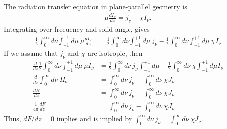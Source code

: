 \newslide

\begin{problem}
The radiation transfer equation in plane-parallel geometry is
\begin{align}
\mu \frac{d I_\nu}{dz} = j_\nu - \chi I_\nu.
\end{align}
Integrating over frequency and solid angle, gives
\begin{align}
\frac{1}{2}\int_0^\infty\!\!\!d\nu\int_{-1}^{+1}\!\!\!d\mu\:\mu\frac{d I_\nu}{dz} 
&=
\frac{1}{2}\int_0^\infty\!\!\!d\nu\int_{-1}^{+1}\!\!\!d\mu\:j_\nu -
\frac{1}{2}\int_0^\infty\!\!\!d\nu\int_{-1}^{+1}\!\!\!d\mu\:\chi I_\nu
\end{align}
If we assume that $j_\nu$ and $\chi$ are isotropic, then
\begin{align}
\frac{d}{dz} \frac{1}{2}\int_0^\infty\!\!\!d\nu\int_{-1}^{+1}\!\!\!d\mu\:\mu I_\nu
&=
\frac{1}{2}\int_0^\infty\!\!\!d\nu\:j_\nu\int_{-1}^{+1}\!\!\!d\mu -
\frac{1}{2}\int_0^\infty\!\!\!d\nu\:\chi\int_{-1}^{+1}\!\!\!d\mu I_\nu\\
\frac{d}{dz}\int_0^\infty\!\!\!d\nu\:H_\nu
&=
\int_0^\infty\!\!\!d\nu\:j_\nu -
\int_0^\infty\!\!\!d\nu\:\chi J_\nu\\
\frac{dH}{dz}
&=
\int_0^\infty\!\!\!d\nu\:j_\nu -
\int_0^\infty\!\!\!d\nu\:\chi J_\nu\\
\frac{1}{4\pi}\frac{dF}{dz}
&=
\int_0^\infty\!\!\!d\nu\:j_\nu -
\int_0^\infty\!\!\!d\nu\:\chi J_\nu
\end{align}
Thus, $dF/dz = 0$ implies and is implied by $\int_0^\infty\!\!\!d\nu\:j_\nu =
\int_0^\infty\!\!\!d\nu\:\chi J_\nu$.
\end{problem}

\newslide

